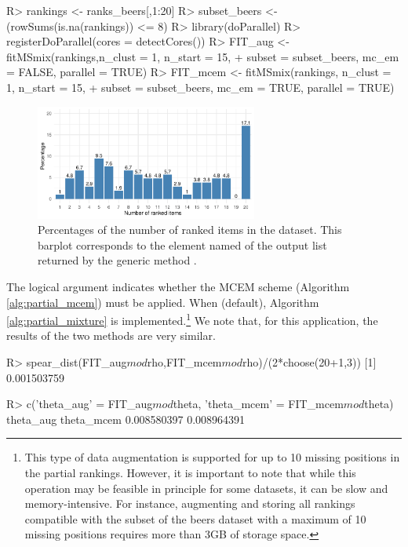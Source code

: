 \begin{example}
R> rankings <- ranks_beers[,1:20]
R> subset_beers <- (rowSums(is.na(rankings)) <= 8)
R> library(doParallel)
R> registerDoParallel(cores = detectCores())
R> FIT_aug <- fitMSmix(rankings,n_clust = 1, n_start = 15, 
+                     subset = subset_beers, mc_em = FALSE, parallel = TRUE)
R> FIT_mcem <- fitMSmix(rankings, n_clust = 1, n_start = 15, 
+                      subset = subset_beers, mc_em = TRUE, parallel = TRUE)
\end{example}
%
\begin{figure}[t]
     \centering
     \includegraphics[width=0.65\textwidth]{figures/RJ2025_paper_descr_beers.pdf}
      \caption{Percentages of the number of ranked items in the  dataset. This barplot corresponds to the element named  of the output list returned by the generic method .}
     \label{fig:descr_beers}
\end{figure}
The logical  argument indicates whether the MCEM scheme (Algorithm \ref{alg:partial_mcem}) must be applied. When  (default),  Algorithm \ref{alg:partial_mixture} is implemented.\footnote{
This type of data augmentation is supported for up to 10 missing positions in the partial rankings. However, it is important to note that while this operation may be feasible in principle for some datasets, it can be slow and memory-intensive. For instance, augmenting and storing all rankings compatible with the subset of the beers dataset with a maximum of 10 missing positions requires more than 3GB of storage space.} 
We note that, for this application, the results of the two methods are very similar.

\begin{example}
R> spear_dist(FIT_aug$mod$rho,FIT_mcem$mod$rho)/(2*choose(20+1,3)) 
[1] 0.001503759

R> c('theta_aug' = FIT_aug$mod$theta, 'theta_mcem' = FIT_mcem$mod$theta)
  theta_aug  theta_mcem 
0.008580397 0.008964391
\end{example}

